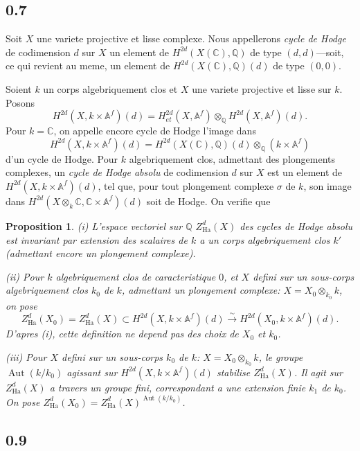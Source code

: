 \documentclass[12pt,a4paper]{article}
\theoremstyle{plain}
\newtheorem{proposition}[theorem]{Proposition}
\theoremstyle{definition}
\theoremstyle{remark}
\DeclareMathOperator{\Aut}{Aut}
\newcommand{\Q}{\mathbb{Q}}
\newcommand{\C}{\mathbb{C}}
\newcommand{\A}{\mathbb{A}}
\begin{document}
\subsection*{0.7}

Soit $X$ une variete projective et lisse complexe. Nous appellerons \emph{cycle de Hodge}
de codimension $d$ sur $X$ un element de $H^{2d}(X(\C), \Q)$ de type $(d,d)$---soit, ce qui
revient au meme, un element de $H^{2d}(X(\C), \Q)(d)$ de type $(0,0)$.

Soient $k$ un corps algebriquement clos et $X$ une variete projective et lisse sur $k$.
Posons
\[
H^{2d}(X, k \times \A^f)(d) = H^{2d}_{et}(X, \A^f) \otimes_{\Q} H^{2d}(X, \A^f)(d).
\]
Pour $k = \C$, on appelle encore cycle de Hodge l'image dans
\[
H^{2d}(X, k \times \A^f)(d) = H^{2d}(X(\C), \Q)(d) \otimes_{\Q} (k \times \A^f)
\]
d'un cycle de Hodge. Pour $k$ algebriquement clos, admettant des plongements complexes,
un \emph{cycle de Hodge absolu} de codimension $d$ sur $X$ est un element de
$H^{2d}(X, k \times \A^f)(d)$, tel que, pour tout plongement complexe $\sigma$ de $k$, son image
dans $H^{2d}(X \otimes_k \C, \C \times \A^f)(d)$ soit de Hodge. On verifie que

\begin{proposition}\label{prop:0.8}
\textup{(i)} L'espace vectoriel sur $\Q$ $Z^d_{\text{Ha}}(X)$ des cycles de Hodge absolu est
invariant par extension des scalaires de $k$ a un corps algebriquement clos $k'$ (admettant
encore un plongement complexe).

\textup{(ii)} Pour $k$ algebriquement clos de caracteristique $0$, et $X$ defini sur un sous-corps
algebriquement clos $k_0$ de $k$, admettant un plongement complexe:
$X = X_0 \otimes_{k_0} k$, on pose
\[
Z^d_{\text{Ha}}(X_0) = Z^d_{\text{Ha}}(X) \subset H^{2d}(X, k \times \A^f)(d) \xrightarrow{\sim} H^{2d}(X_0, k \times \A^f)(d).
\]
D'apres (i), cette definition ne depend pas des choix de $X_0$ et $k_0$.

\textup{(iii)} Pour $X$ defini sur un sous-corps $k_0$ de $k$: $X = X_0 \otimes_{k_0} k$, le groupe
$\Aut(k/k_0)$ agissant sur $H^{2d}(X, k \times \A^f)(d)$ stabilise $Z^d_{\text{Ha}}(X)$. Il agit sur
$Z^d_{\text{Ha}}(X)$ a travers un groupe fini, correspondant a une extension finie $k_1$ de $k_0$.
On pose $Z^d_{\text{Ha}}(X_0) = Z^d_{\text{Ha}}(X)^{\Aut(k/k_0)}$.
\end{proposition}

\subsection*{0.9}
\end{document}

